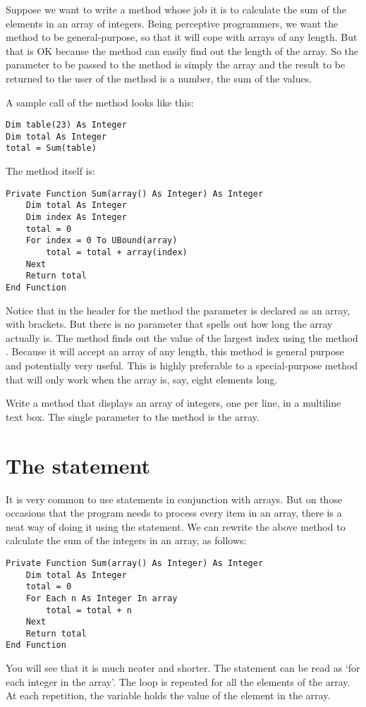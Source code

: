 		Suppose we want to write a method whose job it is to calculate the sum of the elements in an array of integers. Being perceptive programmers, we want the method to be general-purpose, so that it will cope with arrays of any length. But that is OK because the method can easily find out the length of the array. So the parameter to be passed to the method is simply the array and the result to be returned to the user of the method is a number, the sum of the values.
		
		A sample call of the method looks like this:
		\begin{lstlisting}
Dim table(23) As Integer
Dim total As Integer
total = Sum(table)
		\end{lstlisting}
		The method itself is:
		\begin{lstlisting}
Private Function Sum(array() As Integer) As Integer
	Dim total As Integer
	Dim index As Integer
	total = 0
	For index = 0 To UBound(array)
		total = total + array(index)
	Next
	Return total
End Function
		\end{lstlisting}
		
		Notice that in the header for the method the parameter is declared as an array, with brackets. But there is no parameter that spells out how long the array actually is. The method finds out the value of the largest index using the method . Because it will accept an array of any length, this method is general purpose and potentially very useful. This is highly preferable to a special-purpose method that will only work when the array is, say, eight elements long.
		
		\begin{stqb}
			\begin{STQ}
			\item Write a method that displays an array of integers, one per line, in a multiline text box. The single parameter to the method is the array.
			\end{STQ}
		\end{stqb}


	\section{The  statement}
		It is very common to use  statements in conjunction with arrays. But on those occasions that the program needs to process every item in an array, there is a neat way of doing it using the  statement. We can rewrite the above method to calculate the sum of the integers in an array, as follows:
		\begin{lstlisting}
Private Function Sum(array() As Integer) As Integer
	Dim total As Integer
	total = 0
	For Each n As Integer In array
		total = total + n
	Next
	Return total
End Function
		\end{lstlisting}
		You will see that it is much neater and shorter. The  statement can be read as ‘for each integer  in the array'. The loop is repeated for all the elements of the array. At each repetition, the variable  holds the value of the element in the array.


